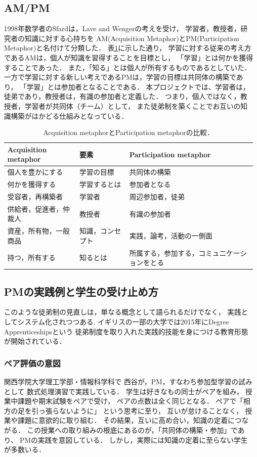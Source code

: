 \documentclass[a4,p11]{article}
\begin{document}
\subsection{AM/PM}
\label{sec:org676b915}
1998年数学者のSfardは，Lave and Wengerの考えを受け，
学習者，教授者，研究者の知識に対する心持ちを
AM(Acquisition Metaphor)とPM(Participation Metaphor)と名付けて分類した\cite{Sfard}．
表\ref{tab:org1f91aee}に示した通り，
学習に対する従来の考え方であるAMは，個人が知識を習得することを目標とし，
「学習」とは何かを獲得することであった．
また，「知る」とは個人が所有するものであるとしていた．
一方で学習に対する新しい考えであるPMは，学習の目標は共同体の構築であり，
「学習」とは参加者となることである．
本プロジェクトでは、学習者は，徒弟であり，教授者は，有識の参加者と定義した．
つまり，個人ではなく，教授者，学習者が共同体（チーム）として，
また徒弟制を築くことでお互いの知識構築がはかどる仕組みとなっている．

\begin{table}[bt]
\caption{\label{tab:org1f91aee}
Acquisition metaphorとParticipation metaphorの比較．}
\centering
\begin{tabular}{lll}
\hline
Acquisition metaphor & 要素 & Participation metaphor\\
\hline
個人を豊かにする & 学習の目標 & 共同体の構築\\
何かを獲得する & 学習するとは & 参加者となる\\
受容者，再構築者 & 学習者 & 周辺参加者，徒弟\\
供給者，促進者，仲裁人 & 教授者 & 有識の参加者\\
資産，所有物，一般商品 & 知識，コンセプト & 実践，論考，活動の一側面\\
持つ，所有する & 知るとは & 所属する，参加する，コミュニケーションをとる\\
\hline
\end{tabular}
\end{table}

\subsection{PMの実践例と学生の受け止め方}
\label{sec:org47a634f}
このような徒弟制の見直しは，単なる概念として語られるだけでなく，
実践としてシステム化されつつある.
イギリスの一部の大学では2015年にDegree Apprenticeshipsという
徒弟制度を取り入れた実践的技能を身につける教育形態が開始されている\cite{DegreeApprenticeship}．
\subsubsection{ペア評価の意図}
\label{sec:org2585e85}
関西学院大学理工学部・情報科学科で
西谷が，PM，すなわち参加型学習の試みとして
数式処理演習で実践している．
学生は好きなもの同士がペアを組み，
授業中課題や期末試験をペアで受け，
ペアの点数は全く同じとなる．
ペアで「相方の足を引っ張らないように」
という思考に至り，
互いが怠けることなく，
授業や課題に意欲的に取り組む．
その結果，互いに高め合い，知識の定着につながる．
この授業への取り組みの根底にあるのが，「共同体の構築・参加」であり、
PMの実践を意図している．
しかし，実際には知識の定着に至らない学生が多数いる．
\end{document}
